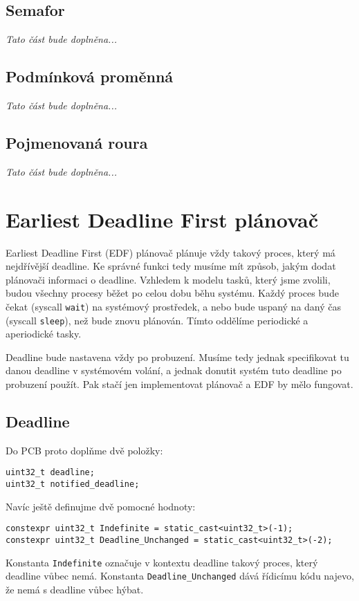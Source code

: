 \documentclass{article}
\begin{document}
\subsection{Semafor}

\emph{Tato část bude doplněna...}

\subsection{Podmínková proměnná}

\emph{Tato část bude doplněna...}

\subsection{Pojmenovaná roura}

\emph{Tato část bude doplněna...}

\section{Earliest Deadline First plánovač}

Earliest Deadline First (EDF) plánovač plánuje vždy takový proces, který má nejdřívější deadline. Ke správné funkci tedy musíme mít způsob, jakým dodat plánovači informaci o deadline. Vzhledem k modelu tasků, který jsme zvolili, budou všechny procesy běžet po celou dobu běhu systému. Každý proces bude čekat (syscall \texttt{wait}) na systémový prostředek, a nebo bude uspaný na daný čas (syscall \texttt{sleep}), než bude znovu plánován. Tímto oddělíme periodické a aperiodické tasky.

Deadline bude nastavena vždy po probuzení. Musíme tedy jednak specifikovat tu danou deadline v systémovém volání, a jednak donutit systém tuto deadline po probuzení použít. Pak stačí jen implementovat plánovač a EDF by mělo fungovat.

\subsection{Deadline}

Do PCB proto doplňme dvě položky:
\begin{lstlisting}
uint32_t deadline;
uint32_t notified_deadline;
\end{lstlisting}
Navíc ještě definujme dvě pomocné hodnoty:
\begin{lstlisting}
constexpr uint32_t Indefinite = static_cast<uint32_t>(-1);
constexpr uint32_t Deadline_Unchanged = static_cast<uint32_t>(-2);
\end{lstlisting}
Konstanta \texttt{Indefinite} označuje v kontextu deadline takový proces, který deadline vůbec nemá. Konstanta \texttt{Deadline\_Unchanged} dává řídicímu kódu najevo, že nemá s deadline vůbec hýbat.
\end{document}
